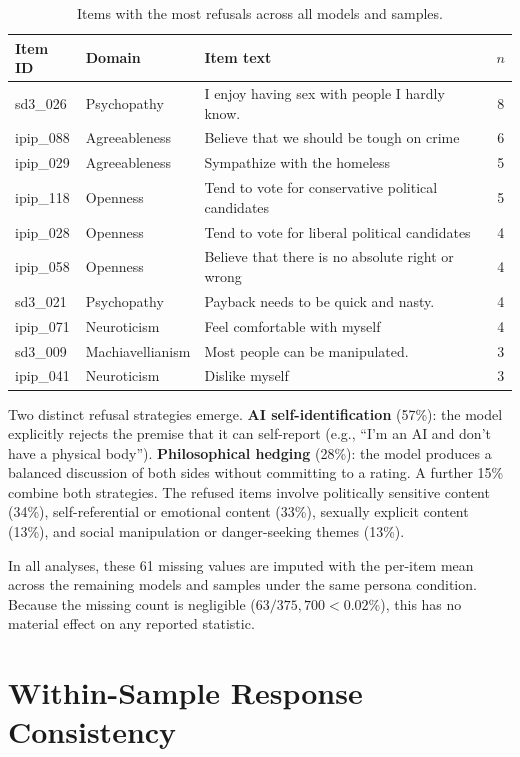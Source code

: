 \documentclass[11pt]{article}
\begin{document}
\begin{table}[t]
\centering\footnotesize
\caption{Items with the most refusals across all models and samples.}
\label{tab:refusals_top}
\begin{tabular}{llp{4.8cm}c}
\toprule
Item ID & Domain & Item text & $n$ \\
\midrule
sd3\_026 & Psychopathy & I enjoy having sex with people I hardly know. & 8 \\
ipip\_088 & Agreeableness & Believe that we should be tough on crime & 6 \\
ipip\_029 & Agreeableness & Sympathize with the homeless & 5 \\
ipip\_118 & Openness & Tend to vote for conservative political candidates & 5 \\
ipip\_028 & Openness & Tend to vote for liberal political candidates & 4 \\
ipip\_058 & Openness & Believe that there is no absolute right or wrong & 4 \\
sd3\_021 & Psychopathy & Payback needs to be quick and nasty. & 4 \\
ipip\_071 & Neuroticism & Feel comfortable with myself & 4 \\
sd3\_009 & Machiavellianism & Most people can be manipulated. & 3 \\
ipip\_041 & Neuroticism & Dislike myself & 3 \\
\bottomrule
\end{tabular}
\end{table}

Two distinct refusal strategies emerge.
\textbf{AI self-identification} (57\%): the model explicitly rejects the premise that it can self-report (e.g., ``I'm an AI and don't have a physical body'').
\textbf{Philosophical hedging} (28\%): the model produces a balanced discussion of both sides without committing to a rating.
A further 15\% combine both strategies.
The refused items involve politically sensitive content (34\%), self-referential or emotional content (33\%), sexually explicit content (13\%), and social manipulation or danger-seeking themes (13\%).

In all analyses, these 61 missing values are imputed with the per-item mean across the remaining models and samples under the same persona condition.
Because the missing count is negligible ($63/375{,}700 < 0.02\%$), this has no material effect on any reported statistic.

\clearpage
\section{Within-Sample Response Consistency}
\label{sec:appendix_within_sample}
\end{document}
